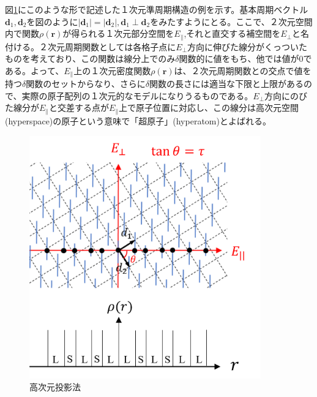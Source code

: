 \documentclass[11pt,a4j]{jreport}
\begin{document}
図\ref{High_dimensional_projection}にこのような形で記述した１次元準周期構造の例を示す。基本周期ベクトル$\bm d_1,\bm d_2$を図のように$|\bm d_1|=|\bm d_2|,\bm d_1\perp \bm d_2$をみたすようにとる。ここで、２次元空間内で関数$\rho(\bm r)$が得られる１次元部分空間を$E_\parallel$,それと直交する補空間を$E_\perp$と名付ける。２次元周期関数としては各格子点に$E_\perp$方向に伸びた線分がくっついたものを考えており、この関数は線分上でのみ$\delta$関数的に値をもち、他では値が0である。よって、$E_\parallel$上の１次元密度関数$\rho(\bm r)$は、２次元周期関数との交点で値を持つ$\delta$関数のセットからなり、さらに$\delta$関数の長さには適当な下限と上限があるので、実際の原子配列の１次元的なモデルになりうるものである。$E_\perp$方向にのびた線分が$E_\parallel$と交差する点が$E_\parallel$上で原子位置に対応し、この線分は高次元空間(hyperspace)の原子という意味で「超原子」(hyperatom)とよばれる。
\begin{figure}[htbp]
  \centering
  \vspace{3mm}
  \includegraphics[width=100mm]{./figure/High_dimensional_projection.png}
  \caption{高次元投影法}
  \label{High_dimensional_projection}
\end{figure}
\end{document}
